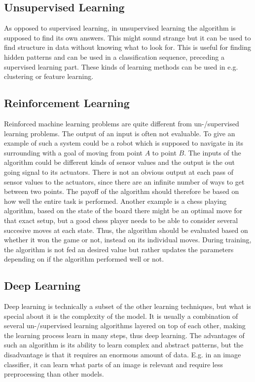\subsection{Unsupervised Learning}
\label{sec:unsuper}

As opposed to supervised learning, in unsupervised learning the algorithm is supposed to find its own answers. This might sound strange but it can be used to find structure in data without knowing what to look for. This is useful for finding hidden patterns and can be used in a classification sequence, preceding a supervised learning part. These kinds of learning methods can be used in e.g. clustering or feature learning.

\subsection{Reinforcement Learning}

Reinforced machine learning problems are quite different from un-/supervised learning problems. The output of an input is often not evaluable. To give an example of such a system could be a robot which is supposed to navigate in its surrounding with a goal of moving from point $A$ to point $B$. The inputs of the algorithm could be different kinds of sensor values and the output is the out going signal to its actuators. There is not an obvious output at each pass of sensor values to the actuators, since there are an infinite number of ways to get between two points. The payoff of the algorithm should therefore be based on how well the entire task is performed. Another example is a chess playing algorithm, based on the state of the board there might be an optimal move for that exact setup, but a good chess player needs to be able to consider several succesive moves at each state. Thus, the algorithm should be evaluated based on whether it won the game or not, instead on its individual moves. During training, the algorithm is not fed an desired value but rather updates the parameters depending on if the algorithm performed well or not.\cite{bishop_neural}

\subsection{Deep Learning}

Deep learning is technically a subset of the other learning techniques, but what is special about it is the complexity of the model. It is usually a combination of several un-/supervised learning algorithms layered on top of each other, making the learning process learn in many steps, thus deep learning. The advantages of such an algorithm is its ability to learn complex and abstract patterns, but the disadvantage is that it requires an enormous amount of data. E.g. in an image classifier, it can learn what parts of an image is relevant and require less preprocessing than other models.

